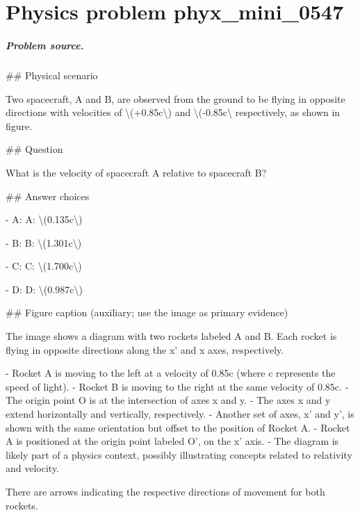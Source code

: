 
\chapter{Physics problem phyx\_mini\_0547}
\label{ch:PhyXMiniProblems_problem_phyx_mini_0547}

\paragraph{Problem source.}
\#\# Physical scenario

Two spacecraft, A and B, are observed from the ground to be flying in opposite directions with velocities of \textbackslash{}(+0.85c\textbackslash{}) and \textbackslash{}(-0.85c\textbackslash{} respectively, as shown in figure.

\#\# Question

What is the velocity of spacecraft A relative to spacecraft B?

\#\# Answer choices

- A: A: \textbackslash{}(0.135c\textbackslash{})

- B: B: \textbackslash{}(1.301c\textbackslash{})

- C: C: \textbackslash{}(1.700c\textbackslash{})

- D: D: \textbackslash{}(0.987c\textbackslash{})

\#\# Figure caption (auxiliary; use the image as primary evidence)

The image shows a diagram with two rockets labeled A and B. Each rocket is flying in opposite directions along the x’ and x axes, respectively. 

- Rocket A is moving to the left at a velocity of 0.85c (where c represents the speed of light).
- Rocket B is moving to the right at the same velocity of 0.85c.
- The origin point O is at the intersection of axes x and y.
- The axes x and y extend horizontally and vertically, respectively.
- Another set of axes, x’ and y’, is shown with the same orientation but offset to the position of Rocket A.
- Rocket A is positioned at the origin point labeled O’, on the x’ axis. 
- The diagram is likely part of a physics context, possibly illustrating concepts related to relativity and velocity.

There are arrows indicating the respective directions of movement for both rockets.

